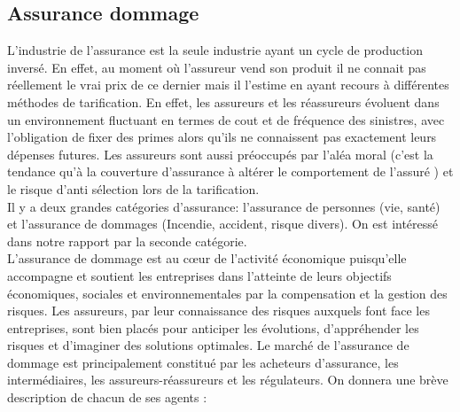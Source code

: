 \documentclass[11pt]{article}
\begin{document}
\subsection{Assurance dommage} 
L’industrie de l’assurance est la seule industrie ayant un cycle de production inversé. En effet, au moment où l’assureur vend son produit il ne connait pas réellement le vrai prix de ce dernier mais il l’estime en ayant recours à différentes méthodes de tarification. En effet, les assureurs et les réassureurs évoluent dans un environnement fluctuant en termes de cout et de fréquence des sinistres, avec l’obligation de fixer des primes alors qu’ils ne connaissent pas exactement leurs dépenses futures.  Les assureurs sont aussi préoccupés par l’aléa moral \cite{winter} (c’est la tendance qu’à la couverture d’assurance à altérer le comportement de l’assuré \cite{shavell1979}) et le risque d’anti sélection \cite{dionne2013} lors de la tarification.\\
Il y a deux grandes catégories d’assurance: l’assurance de personnes (vie, santé) et l’assurance de dommages (Incendie, accident, risque divers).  On est intéressé dans notre rapport par la seconde catégorie.\\
L’assurance de dommage est au cœur de l’activité économique puisqu’elle accompagne et soutient les entreprises dans l’atteinte de leurs objectifs économiques, sociales et environnementales \cite{moreaudeveloppement} par la compensation et la gestion des risques. Les assureurs, par leur connaissance des risques auxquels font face les entreprises, sont bien placés pour anticiper les évolutions, d’appréhender les risques et d’imaginer des solutions optimales. 
\cite{parodi2014pricing} Le marché de l’assurance de dommage est principalement constitué par les acheteurs d’assurance, les intermédiaires, les assureurs-réassureurs et les régulateurs. On donnera une brève description de chacun de ses agents :
\end{document}
